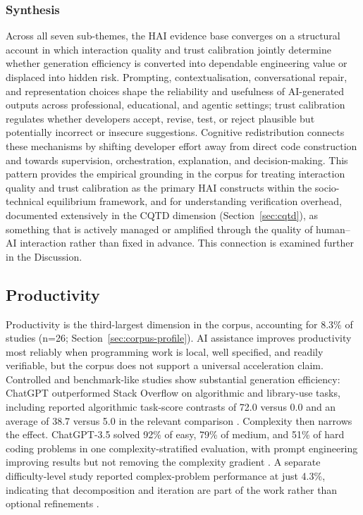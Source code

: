 \subsubsection{Synthesis}
\label{sec:hai-synthesis}
Across all seven sub-themes, the HAI evidence base converges on a structural account in which interaction quality and trust calibration jointly determine whether generation efficiency is converted into dependable engineering value or displaced into hidden risk. Prompting, contextualisation, conversational repair, and representation choices shape the reliability and usefulness of AI-generated outputs across professional, educational, and agentic settings; trust calibration regulates whether developers accept, revise, test, or reject plausible but potentially incorrect or insecure suggestions. Cognitive redistribution connects these mechanisms by shifting developer effort away from direct code construction and towards supervision, orchestration, explanation, and decision-making. This pattern provides the empirical grounding in the corpus for treating interaction quality and trust calibration as the primary HAI constructs within the socio-technical equilibrium framework, and for understanding verification overhead, documented extensively in the CQTD dimension (Section~\ref{sec:cqtd}), as something that is actively managed or amplified through the quality of human--AI interaction rather than fixed in advance. This connection is examined further in the Discussion.

\subsection{Productivity}
\label{sec:productivity}
Productivity is the third-largest dimension in the corpus, accounting for 8.3\% of studies (n=26; Section~\ref{sec:corpus-profile}). AI assistance improves productivity most reliably when programming work is local, well specified, and readily verifiable, but the corpus does not support a universal acceleration claim. Controlled and benchmark-like studies show substantial generation efficiency: ChatGPT outperformed Stack Overflow on algorithmic and library-use tasks, including reported algorithmic task-score contrasts of 72.0 versus 0.0 and an average of 38.7 versus 5.0 in the relevant comparison \cite{liu_chatgpt_2023}. Complexity then narrows the effect. ChatGPT-3.5 solved 92\% of easy, 79\% of medium, and 51\% of hard coding problems in one complexity-stratified evaluation, with prompt engineering improving results but not removing the complexity gradient \cite{li_evaluating_2024}. A separate difficulty-level study reported complex-problem performance at just 4.3\%, indicating that decomposition and iteration are part of the work rather than optional refinements \cite{yan_closer_2023}.

